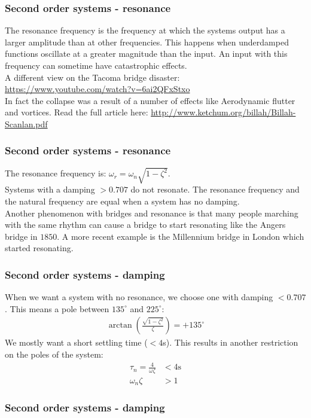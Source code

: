 \begin{frame}
\frametitle{Second order systems - resonance}
The resonance frequency is the frequency at which the systems output has a larger amplitude than at other frequencies. This happens when underdamped functions oscillate at a greater magnitude than the input. An input with this frequency can sometime have catastrophic effects.\\
\vspace{0.35cm}
A different view on the Tacoma bridge disaster: \url{https://www.youtube.com/watch?v=6ai2QFxStxo}\\
\vspace{0.35cm}
In fact the collapse was a result of a number of effects like Aerodynamic flutter and vortices. Read the full article here: \url{http://www.ketchum.org/billah/Billah-Scanlan.pdf}
\end{frame}

\begin{frame}
\frametitle{Second order systems - resonance}
The resonance frequency is: $\omega_r = \omega_n\sqrt{1-\zeta^2}$.\\
\vspace{0.35cm}
Systems with a damping $>0.707$ do not resonate. The resonance frequency and the natural frequency are equal when a system has no damping.\\
\vspace{0.35cm}
Another phenomenon with bridges and resonance is that many people marching with the same rhythm can cause a bridge to start resonating like the Angers bridge in $1850$. A more recent example is the Millennium bridge in London which started resonating.
\end{frame}

\begin{frame}
\frametitle{Second order systems - damping}
When we want a system with no resonance, we choose one with damping $<0.707$. This means a pole between $135^{\circ}$ and $225^{\circ}$:
\begin{align*}
\arctan(\frac{\sqrt{1-\zeta^2}}{\zeta}) = +135^{\circ}
\end{align*}
We mostly want a short settling time ($<4$s). This results in another restriction on the poles of the system: 
\begin{align*}
\tau_n= \frac{4}{\omega\zeta}&< 4\text{s}\\
\omega_n\zeta&>1
\end{align*}
\end{frame}

\begin{frame}
\frametitle{Second order systems - damping}
\begin{figure}
\end{figure}
\end{frame}



